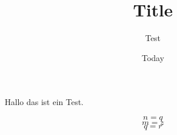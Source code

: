 \documentclass[11pt]{article}
\begin{document}
\title{Title}
\author{Test}
\date{Today}
Hallo das ist ein Test. \\

\begin{multicols}{3}
\begin{equation}
n = q
\end{equation}
\begin{equation}
m = z
\end{equation}
\begin{equation}
q = r
\end{equation}
\end{multicols}
\end{document}
